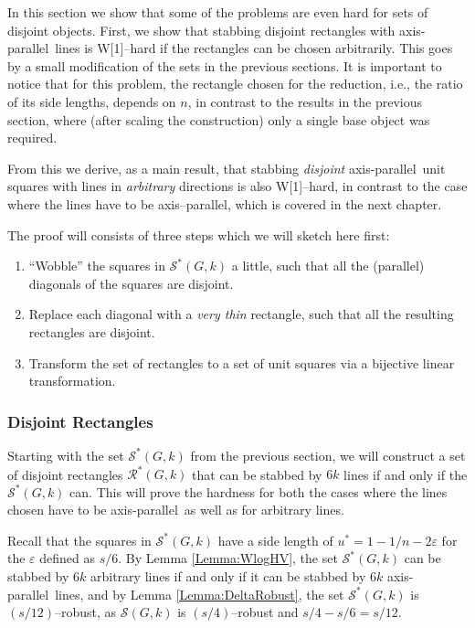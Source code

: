 \documentclass[12pt]{article}
\newcommand{\eps}{\varepsilon}
\newcommand{\cclass}[1]{{#1}}
\newcommand{\wone}{\cclass{W[1]}}
\newcommand{\ap}{a.p.\ }
\renewcommand{\ap}{axis-parallel\ }
\newcommand{\calS}{\mathcal{S}}
\begin{document}
In this section we show that some of the problems are even hard for sets of disjoint objects. First, we show that stabbing disjoint rectangles with \ap lines is \wone--hard if the rectangles can be chosen arbitrarily. This goes by a small modification of the sets in the previous sections. It is important to notice that for this problem, the rectangle chosen for the reduction, i.e., the ratio of its side lengths, depends on $n$, in contrast to the results in the previous section, where (after scaling the construction) only a single base object was required. 

From this we derive, as a main result, that stabbing \emph{disjoint} \ap unit squares with lines in \emph{arbitrary} directions is also \wone--hard, in contrast to the case where the lines have to be axis--parallel, which is covered in the next chapter.

The proof will consists of three steps which we will sketch here first:
\begin{enumerate}
	\item ``Wobble'' the squares in $\calS^*(G, k)$ a little, such that all the (parallel) diagonals of the squares are disjoint.
	\item Replace each diagonal with a \emph{very thin} rectangle, such that all the resulting rectangles are disjoint.
	\item Transform the set of rectangles to a set of unit squares via a bijective linear transformation.
\end{enumerate}


\subsubsection{Disjoint Rectangles}
Starting with the set $\calS^*(G, k)$ from the previous section, we will construct a set of disjoint rectangles $\mathcal R^*(G, k)$ that can be stabbed by $6k$ lines if and only if the $\calS^*(G, k)$ can. This will prove the hardness for both the cases where the lines chosen have to be \ap as well as for arbitrary lines.

Recall that the squares in $\calS^*(G, k)$ have a side length of $u^* = 1 - 1/n - 2\eps$ for the $\eps$ defined as $s/6$. By Lemma \ref{Lemma:WlogHV}, the set $\calS^*(G, k)$ can be stabbed by $6k$ arbitrary lines if and only if it can be stabbed by $6k$ \ap lines, and by Lemma \ref{Lemma:DeltaRobust}, the set $\calS^*(G, k)$ is $(s/12)$--robust, as $\calS(G, k)$ is $(s/4)$--robust and $s/4 - s/6 = s/12$.
\end{document}

